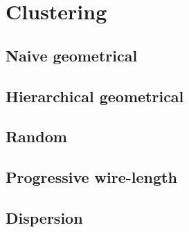 \section{Clustering}

\subsection{Naive geometrical}

\subsection{Hierarchical geometrical}

\subsection{Random}

\subsection{Progressive wire-length}

\subsection{Dispersion}